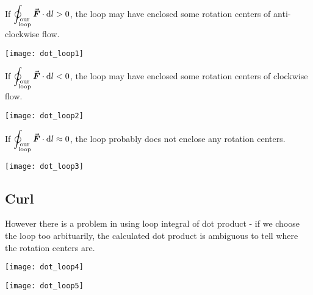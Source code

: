 \documentclass[class=article, crop=false, 12pt]{standalone}
\begin{document}
\begin{center}
    \begin{minipage}{0.5\linewidth}
        \centering
        If $\displaystyle \oint_{\substack{\text{our}\\\text{loop}}} \va*{F}\cdot \dd{l} > 0$,
        the loop may have enclosed some rotation centers of anti-clockwise flow.
    \end{minipage}
    \hspace{0.05\textwidth}
    \begin{minipage}{0.25\linewidth}
        \centering
        \texttt{[image: dot\_loop1]}
    \end{minipage}
\end{center}
\begin{center}
    \begin{minipage}{0.5\linewidth}
        \centering
        If $\displaystyle \oint_{\substack{\text{our}\\\text{loop}}} \va*{F}\cdot \dd{l} < 0$,
        the loop may have enclosed some rotation centers of clockwise flow.
    \end{minipage}
    \hspace{0.05\textwidth}
    \begin{minipage}{0.25\linewidth}
        \centering
        \texttt{[image: dot\_loop2]}
    \end{minipage}
\end{center}
\begin{center}
    \begin{minipage}{0.5\linewidth}
        \centering
        If $\displaystyle \oint_{\substack{\text{our}\\\text{loop}}} \va*{F}\cdot \dd{l} \approx 0$,
        the loop probably does not enclose any rotation centers.
    \end{minipage}
    \hspace{0.05\textwidth}
    \begin{minipage}{0.25\linewidth}
        \centering
        \texttt{[image: dot\_loop3]}
    \end{minipage}
\end{center}




\subsection{Curl}

However there is a problem in using loop integral of dot product - 
if we choose the loop too arbituarily, 
the calculated dot product is ambiguous to tell where the rotation centers are.
\begin{center}
    \begin{minipage}{0.2\linewidth}
        \centering
        \texttt{[image: dot\_loop4]}
    \end{minipage}
    \hspace{0.1\textwidth}
    \begin{minipage}{0.35\linewidth}
        \centering
        \texttt{[image: dot\_loop5]}
    \end{minipage}
\end{center}
\end{document}
